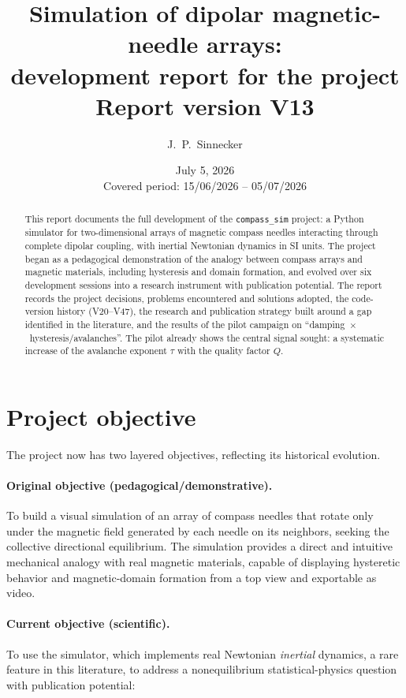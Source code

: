 \documentclass[11pt,a4paper]{article}
\title{\textbf{Simulation of dipolar magnetic-needle arrays:\\
development report for the \code{compass\_sim} project}\\[1ex]
\large Report version V13}
\author{J.~P.~Sinnecker}
\date{July 5, 2026\\[0.5ex]
\small Covered period: 15/06/2026 -- 05/07/2026}
\newcommand{\code}[1]{\texttt{#1}}
\begin{document}
\maketitle

\begin{abstract}
\noindent
This report documents the full development of the \code{compass\_sim} project: a Python simulator for two-dimensional arrays of magnetic compass needles interacting through complete dipolar coupling, with inertial Newtonian dynamics in SI units. The project began as a pedagogical demonstration of the analogy between compass arrays and magnetic materials, including hysteresis and domain formation, and evolved over six development sessions into a research instrument with publication potential. The report records the project decisions, problems encountered and solutions adopted, the code-version history (V20--V47), the research and publication strategy built around a gap identified in the literature, and the results of the pilot campaign on ``damping~$\times$~hysteresis/avalanches''. The pilot already shows the central signal sought: a systematic increase of the avalanche exponent $\tau$ with the quality factor $Q$.
\end{abstract}

\tableofcontents
\newpage

\section{Project objective}

The project now has two layered objectives, reflecting its historical evolution.

\paragraph{Original objective (pedagogical/demonstrative).}
To build a visual simulation of an array of compass needles that rotate only under the magnetic field generated by each needle on its neighbors, seeking the collective directional equilibrium. The simulation provides a direct and intuitive mechanical analogy with real magnetic materials, capable of displaying hysteretic behavior and magnetic-domain formation from a top view and exportable as video.

\paragraph{Current objective (scientific).}
To use the simulator, which implements real Newtonian \emph{inertial} dynamics, a rare feature in this literature, to address a nonequilibrium statistical-physics question with publication potential:
\end{document}
